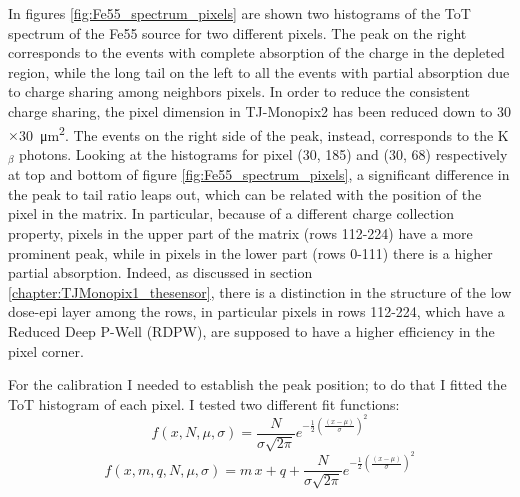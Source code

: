         In figures \ref{fig:Fe55_spectrum_pixels} are shown two histograms of the ToT spectrum of the Fe55 source for two different pixels. The peak on the right corresponds to the events with complete absorption of the charge in the depleted region, while the long tail on the left to all the events with partial absorption due to charge sharing among neighbors pixels. In order to reduce the consistent charge sharing, the pixel dimension in TJ-Monopix2 has been reduced down to 30$\times$\SI{30}{\um\squared}. 
        The events on the right side of the peak, instead, corresponds to the K$_{\beta}$ photons. 
        Looking at the histograms for pixel (30, 185) and (30, 68) respectively at top and bottom of figure \ref{fig:Fe55_spectrum_pixels}, a significant difference in the peak to tail ratio leaps out, which can be related with the position of the pixel in the matrix.
        In particular, because of a different charge collection property, pixels in the upper part of the matrix (rows 112-224) have a more prominent peak, while in pixels in the lower part (rows 0-111) there is a higher partial absorption.
        Indeed, as discussed in section \ref{chapter:TJMonopix1_thesensor}, there is a distinction in the structure of the low dose-epi layer among the rows, in particular pixels in rows 112-224, which have a Reduced Deep P-Well (RDPW), are supposed to have a higher efficiency in the pixel corner. 
        
        For the calibration I needed to establish the peak position; to do that I fitted the ToT histogram of each pixel. I tested two different fit functions:  
        \begin{equation} \label{eq:gauss}
            f(x, N, \mu, \sigma) = \frac{N}{\sigma \sqrt{2\pi}} e^{-\frac{1}{2}(\frac{(x-\mu)}{\sigma})^2}
        \end{equation} 
        \begin{equation} \label{eq:gauss_line}
            f(x, m, q, N, \mu, \sigma) = m\,x + q + \frac{N}{\sigma \sqrt{2\pi}} e^{-\frac{1}{2}(\frac{(x-\mu)}{\sigma})^2}
        \end{equation}          
        
